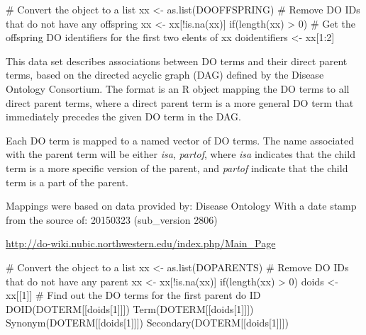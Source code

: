\documentclass[a4paper]{book}
\begin{document}
%
\begin{Examples}
\begin{ExampleCode}
  # Convert the object to a list
  xx <- as.list(DOOFFSPRING)
  # Remove DO IDs that do not have any offspring
  xx <- xx[!is.na(xx)]
   if(length(xx) > 0){
    # Get the offspring DO identifiers for the first two elents of xx
    doidentifiers <- xx[1:2]
  }
\end{ExampleCode}
\end{Examples}
%
\begin{Description}\relax
This data set describes associations between DO
terms and their direct parent  terms, based on the directed acyclic
graph (DAG) defined by the Disease Ontology Consortium. The format is an R
object mapping the DO  terms to all direct parent terms, where a
direct parent term is a more general DO term that immediately precedes
the given DO term in the DAG.
\end{Description}
%
\begin{Details}\relax
Each DO  term is mapped to a named vector of DO  terms. The name
associated with the parent term will be either \emph{isa}, \emph{partof},
where \emph{isa} indicates that the child term is a more specific version
of the parent, and  \emph{partof} indicate that the
child term is a part of the parent. 


Mappings were based on data provided by: Disease Ontology
With a date stamp from the source of: 20150323 (sub\_version 2806)


\end{Details}
%
\begin{References}\relax
\url{http://do-wiki.nubic.northwestern.edu/index.php/Main_Page} 

\end{References}
%
\begin{Examples}
\begin{ExampleCode}
  # Convert the object to a list
  xx <- as.list(DOPARENTS)
  # Remove DO IDs that do not have any parent
  xx <- xx[!is.na(xx)]
  if(length(xx) > 0){
     doids <- xx[[1]]
     # Find out the DO terms for the first parent do ID
     DOID(DOTERM[[doids[1]]])
     Term(DOTERM[[doids[1]]])
     Synonym(DOTERM[[doids[1]]])
     Secondary(DOTERM[[doids[1]]])
  }
\end{ExampleCode}
\end{Examples}
\end{document}
